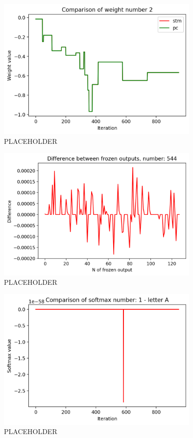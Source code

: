 \documentclass[12pt]{report}
\begin{document}
%
%
\begin{figure}[h!]
    \centering
    \includegraphics[width=100mm]{Figures/Chapter5/weight_example.png} 
    \caption{PLACEHOLDER}
    \label{fig:comparison_weights}    
\end{figure}
%
%
\begin{figure}[h!]
    \centering
    \includegraphics[width=100mm]{Figures/Chapter5/frozen_example.png} 
    \caption{PLACEHOLDER}
    \label{fig:comparison_frozen}    
\end{figure}
%
%
\begin{figure}[h!]
    \centering
    \includegraphics[width=100mm]{Figures/Chapter5/softmax_example.png} 
    \caption{PLACEHOLDER}
    \label{fig:comparison_softmax}    
\end{figure}
\end{document}
